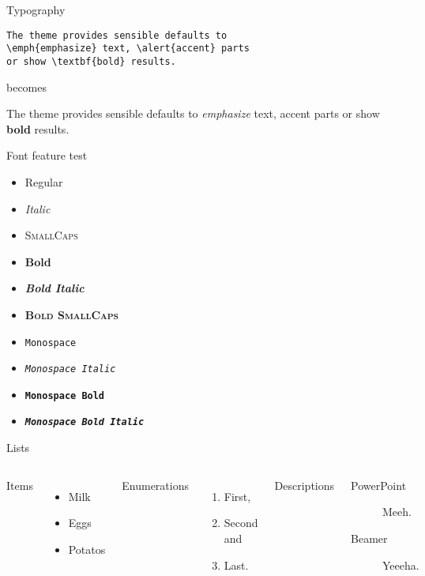 \documentclass[9pt,serif,mathserif]{beamer}
\begin{document}
\begin{frame}[fragile]{Typography}
        \begin{verbatim}The theme provides sensible defaults to
\emph{emphasize} text, \alert{accent} parts
or show \textbf{bold} results.\end{verbatim}

    \begin{center}becomes\end{center}

    The theme provides sensible defaults to \emph{emphasize} text,
    \alert{accent} parts or show \textbf{bold} results.
\end{frame}

\begin{frame}{Font feature test}
    \begin{itemize}
    \item Regular
    \item \textit{Italic}
    \item \textsc{SmallCaps}
    \item \textbf{Bold}
    \item \textbf{\textit{Bold Italic}}
    \item \textbf{\textsc{Bold SmallCaps}}
    \item \texttt{Monospace}
    \item \texttt{\textit{Monospace Italic}}
    \item \texttt{\textbf{Monospace Bold}}
    \item \texttt{\textbf{\textit{Monospace Bold Italic}}}
    \end{itemize}
\end{frame}

\begin{frame}{Lists}
    \begin{columns}[T,onlytextwidth]
        Items
        \begin{itemize}
        \item Milk \item Eggs \item Potatos
        \end{itemize}

        Enumerations
        \begin{enumerate}
        \item First, \item Second and \item Last.
        \end{enumerate}

        Descriptions
        \begin{description}
        \item[PowerPoint] Meeh. \item[Beamer] Yeeeha.
        \end{description}
    \end{columns}
\end{frame}
\end{document}
